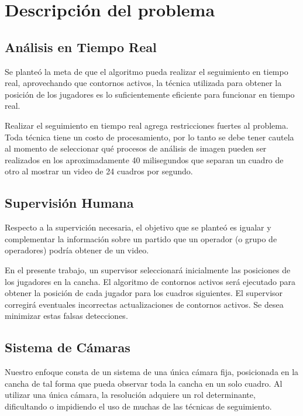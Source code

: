 \section{Descripción del problema}

\subsection{Análisis en Tiempo Real}

Se planteó la meta de que el algoritmo pueda realizar el seguimiento en tiempo
real, aprovechando que contornos activos, la técnica utilizada para obtener la
posición de los jugadores es lo suficientemente eficiente para funcionar en
tiempo real.

Realizar el seguimiento en tiempo real agrega restricciones fuertes al
problema. Toda técnica tiene un costo de procesamiento, por lo tanto se debe
tener cautela al momento de seleccionar qué procesos de análisis de imagen
pueden ser realizados en los aproximadamente 40 milisegundos que separan un
cuadro de otro al mostrar un video de 24 cuadros por segundo.

\subsection{Supervisión Humana}



Respecto a la supervición necesaria, el objetivo que se planteó es igualar y
complementar la información sobre un partido que un operador (o grupo de
operadores) podría obtener de un video.

En el presente trabajo, un supervisor seleccionará inicialmente las posiciones
de los jugadores en la cancha. El algoritmo de contornos activos será
ejecutado para obtener la posición de cada jugador para los cuadros siguientes.
El supervisor corregirá eventuales incorrectas actualizaciones de contornos
activos. Se desea minimizar estas falsas detecciones.

\subsection{Sistema de Cámaras}

Nuestro enfoque consta de un sistema de una única cámara fija, posicionada en
la cancha de tal forma que pueda observar toda la cancha en un solo cuadro. Al
utilizar una única cámara, la resolución adquiere un rol determinante,
dificultando o impidiendo el uso de muchas de las técnicas de seguimiento.

